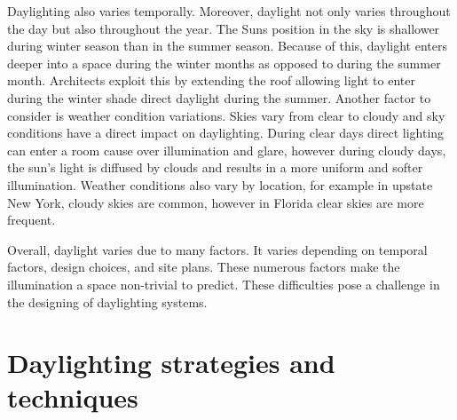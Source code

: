 Daylighting also varies temporally.
Moreover, daylight not only varies throughout the day but also throughout the year.
The Suns position in the sky is shallower during winter season than in the summer season. Because of this, daylight enters deeper into a space during the winter months as opposed to during the summer month.
Architects exploit this by extending the roof allowing light to enter during the winter shade direct daylight during the summer.
Another factor to consider is weather condition variations. Skies vary from clear to cloudy and sky conditions have a direct impact on daylighting. During clear days direct lighting can enter a room cause over illumination and glare, however during cloudy days, the sun's light is diffused by clouds and results in a more uniform and softer illumination.
Weather conditions also vary by location, for example in upstate New York, cloudy skies are common, however in Florida clear skies are more frequent.

Overall, daylight varies due to many factors. It varies depending on temporal factors, design choices, and site plans. These numerous factors make the illumination a space non-trivial to predict. These difficulties pose a challenge in the designing of daylighting systems.


\section{Daylighting strategies and techniques}

